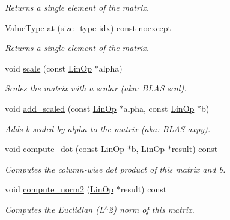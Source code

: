 \begin{DoxyCompactItemize}
\begin{DoxyCompactList}\small\item\em Returns a single element of the matrix. \end{DoxyCompactList}\item 
Value\+Type \hyperlink{classgko_1_1matrix_1_1Dense_a34ba8a7f392c65c481a93d9374cb5769}{at} (\hyperlink{namespacegko_a6e5c95df0ae4e47aab2f604a22d98ee7}{size\+\_\+type} idx) const noexcept
\begin{DoxyCompactList}\small\item\em Returns a single element of the matrix. \end{DoxyCompactList}\item 
void \hyperlink{classgko_1_1matrix_1_1Dense_a35cb8dfff52daf3aa8995597d26981ec}{scale} (const \hyperlink{classgko_1_1LinOp}{Lin\+Op} $\ast$alpha)
\begin{DoxyCompactList}\small\item\em Scales the matrix with a scalar (aka\+: B\+L\+AS scal). \end{DoxyCompactList}\item 
void \hyperlink{classgko_1_1matrix_1_1Dense_ae6c4c15972b76bf7d8f6d50a96abda8d}{add\+\_\+scaled} (const \hyperlink{classgko_1_1LinOp}{Lin\+Op} $\ast$alpha, const \hyperlink{classgko_1_1LinOp}{Lin\+Op} $\ast$b)
\begin{DoxyCompactList}\small\item\em Adds {\ttfamily b} scaled by {\ttfamily alpha} to the matrix (aka\+: B\+L\+AS axpy). \end{DoxyCompactList}\item 
void \hyperlink{classgko_1_1matrix_1_1Dense_acb568ff44addb095b82bbd2fbe704761}{compute\+\_\+dot} (const \hyperlink{classgko_1_1LinOp}{Lin\+Op} $\ast$b, \hyperlink{classgko_1_1LinOp}{Lin\+Op} $\ast$result) const
\begin{DoxyCompactList}\small\item\em Computes the column-\/wise dot product of this matrix and {\ttfamily b}. \end{DoxyCompactList}\item 
void \hyperlink{classgko_1_1matrix_1_1Dense_a97fd354c4a26814586cd256b5f0d7bea}{compute\+\_\+norm2} (\hyperlink{classgko_1_1LinOp}{Lin\+Op} $\ast$result) const
\begin{DoxyCompactList}\small\item\em Computes the Euclidian (L$^\wedge$2) norm of this matrix. \end{DoxyCompactList}\item 

\end{DoxyCompactItemize}
